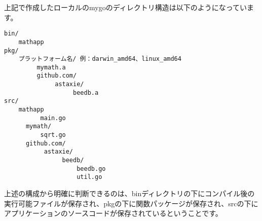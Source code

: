 上記で作成したローカルのmygoのディレクトリ構造は以下のようになっています。


\begin{lstlisting}[numbers=none]
bin/
    mathapp
pkg/
    プラットフォーム名/ 例：darwin_amd64、linux_amd64
         mymath.a
         github.com/
              astaxie/
                   beedb.a
src/
    mathapp
          main.go
      mymath/
          sqrt.go
      github.com/
           astaxie/
                beedb/
                    beedb.go
                    util.go
\end{lstlisting}


上述の構成から明確に判断できるのは、binディレクトリの下にコンパイル後の実行可能ファイルが保存され、pkgの下に関数パッケージが保存され、srcの下にアプリケーションのソースコードが保存されているということです。

